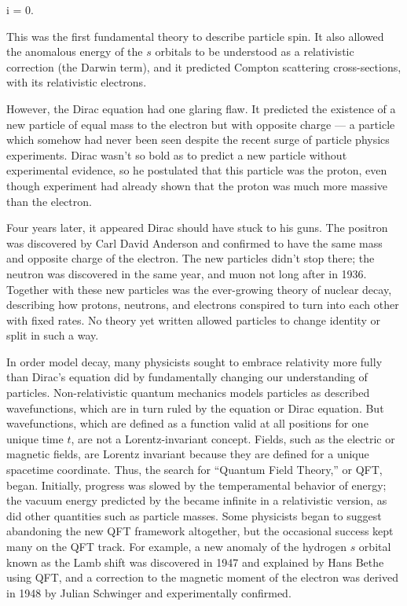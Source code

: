 \begin{e}
  i\parens{\del_\mu \sigma^\mu} \psi = 0.
  \label{eqn:dirac}
\end{e}
This was the first fundamental theory to describe particle spin. It also allowed the anomalous energy of the $s$ orbitals to be understood as a relativistic correction (the Darwin term), and it predicted Compton scattering cross-sections, with its relativistic electrons.

However, the Dirac equation had one glaring flaw. It predicted the existence of a new particle of equal mass to the electron but with opposite charge --- a particle which somehow had never been seen despite the recent surge of particle physics experiments. Dirac wasn't so bold as to predict a new particle without experimental evidence, so he postulated that this particle was the proton, even though experiment had already shown that the proton was much more massive than the electron.

Four years later, it appeared Dirac should have stuck to his guns. The positron was discovered by Carl David Anderson and confirmed to have the same mass and opposite charge of the electron. The new particles didn't stop there; the neutron was discovered in the same year, and muon not long after in 1936. Together with these new particles was the ever-growing theory of nuclear decay, describing how protons, neutrons, and electrons conspired to turn into each other with fixed rates. No theory yet written allowed particles to change identity or split in such a way.

In order model decay, many physicists sought to embrace relativity more fully than Dirac's equation did by fundamentally changing our understanding of particles. Non-relativistic quantum mechanics models particles as described wavefunctions, which are in turn ruled by the \Schrodinger equation or Dirac equation. But wavefunctions, which are defined as a function valid at all positions for one unique time $t$, are not a Lorentz-invariant concept. Fields, such as the electric or magnetic fields, are Lorentz invariant because they are defined for a unique spacetime coordinate. Thus, the search for ``Quantum Field Theory,'' or QFT, began. Initially, progress was slowed by the temperamental behavior of energy; the vacuum energy predicted by the \Schrodinger became infinite in a relativistic version, as did other quantities such as particle masses. Some physicists began to suggest abandoning the new QFT framework altogether, but the occasional success kept many on the QFT track. For example, a new anomaly of the hydrogen $s$ orbital known as the Lamb shift was discovered in 1947 and explained by Hans Bethe using QFT, and a correction to the magnetic moment of the electron was derived in 1948 by Julian Schwinger and experimentally confirmed.


